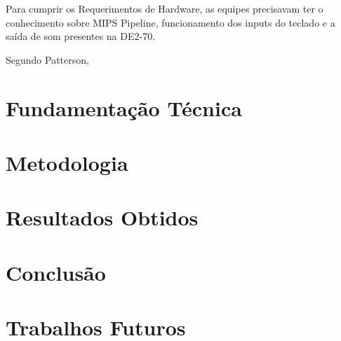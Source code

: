 \documentclass{vgtc}                          %
\begin{document}
Para cumprir os Requerimentos de Hardware, as equipes precisavam ter o conhecimento sobre MIPS Pipeline, funcionamento dos inputs do teclado e a saída de som presentes na DE2-70.

Segundo Patterson,   

\section{Fundamentação Técnica}




\section{Metodologia}


\section{Resultados Obtidos}



\section{Conclusão}


\section{Trabalhos Futuros}



\end{document}
